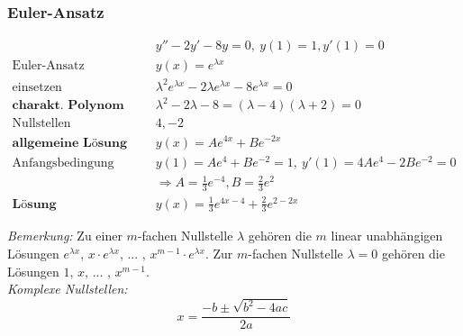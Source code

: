 \documentclass[11pt]{article}
\begin{document}
%

\subsubsection{Euler-Ansatz}

\begin{equation*}
\begin{split}
	& y'' - 2y' - 8y = 0,\ y(1) = 1, y'(1) = 0 \\
	\text{Euler-Ansatz}\quad & y(x) = e^{\lambda x} \\
	\text{einsetzen}\quad & \lambda^2 e^{\lambda x} - 2\lambda e^{\lambda x} - 8e^{\lambda x} = 0 \\
	\textbf{charakt. Polynom}\quad & \lambda^2 - 2\lambda - 8 = (\lambda - 4)(\lambda + 2) = 0 \\
	\text{Nullstellen}\quad & 4, -2 \\
	\textbf{allgemeine L{\"o}sung}\quad & y(x) = Ae^{4x} + Be^{-2x} \\
	\text{Anfangsbedingung gebrauchen}\quad & y(1) = Ae^4 + Be^{-2} = 1,\ y'(1) = 4Ae^4 - 2Be^{-2} = 0 \\
											& \Rightarrow A = \frac{1}{3}e^{-4}, B = \frac{2}{3}e^2 \\
	\textbf{L{\"o}sung}\quad & y(x) = \frac{1}{3}e^{4x-4} + \frac{2}{3}e^{2-2x}
\end{split}
\end{equation*}

\emph{Bemerkung:} Zu einer $m$-fachen Nullstelle $\lambda$ geh{\"o}ren die $m$ linear unabh{\"a}ngigen L{\"o}sungen $e^{\lambda x}$, $x\cdot e^{\lambda x}$, ... , $x^{m-1}\cdot e^{\lambda x}$. Zur $m$-fachen Nullstelle $\lambda = 0$ geh{\"o}ren die L{\"o}sungen $1$, $x$, ... , $x^{m-1}$. \\
 
\emph{Komplexe Nullstellen:} \\

\begin{equation*}
	x = \frac{-b \pm \sqrt{b^2-4ac}}{2a}
\end{equation*}
\end{document}

